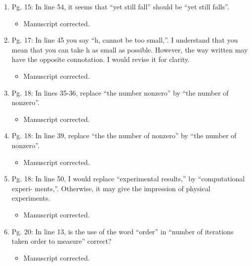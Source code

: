 \documentclass{article}
\begin{document}
\begin{enumerate}
\begin{enumerate}
 \item Pg. 15: In line 54, it seems that “yet still fall” should be “yet still falls”.

{\color{red}  
\begin{itemize}
     \item
 Manuscript corrected. 
  \end{itemize}}

 \item Pg. 17: In line 45 you say “h, cannot be too small,”.
I understand that you mean that you can take h as small as possible. However, the way written may have the
opposite connotation. I would revise it for clarity.

{\color{red}  
\begin{itemize}
     \item
 Manuscript corrected. 
  \end{itemize}}

 \item Pg. 18: In lines 35-36, replace “the number nonzero” by “the number of nonzero”.

{\color{red}  
\begin{itemize}
     \item
 Manuscript corrected. 
  \end{itemize}}

 \item Pg. 18: In line 39, replace “the the number of nonzero” by “the number of nonzero”.

{\color{red}  
\begin{itemize}
     \item
 Manuscript corrected. 
  \end{itemize}}

 \item Pg. 18: In line 50, I would replace “experimental results,” by “computational experi-
ments,”. Otherwise, it may give the impression of physical experiments.

{\color{red}  
\begin{itemize}
     \item
 Manuscript corrected. 
  \end{itemize}}

 \item Pg. 20: In line 13, is the use of the word “order” in “number of iterations taken order
to measure” correct?

{\color{red}  
\begin{itemize}
     \item
 Manuscript corrected.
  \end{itemize}}


\end{enumerate}
\end{enumerate}
\end{document}
